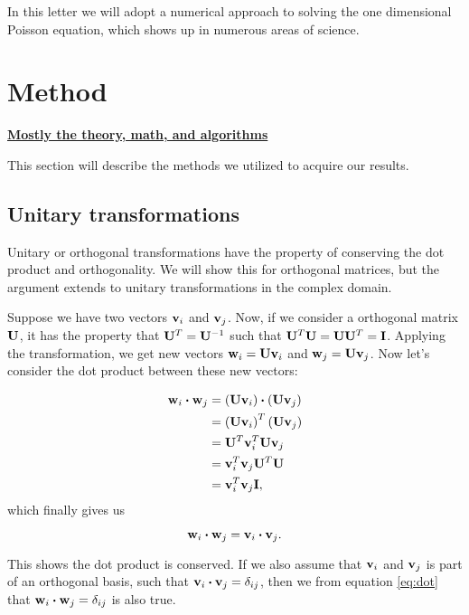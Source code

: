 \documentclass{emulateapj}
\begin{document}
In this letter we will adopt a numerical approach to solving the one dimensional Poisson equation, which shows up in numerous areas of science.

\section{Method}
\label{sec:method}
\underline{\textbf{Mostly the theory, math, and algorithms}}

This section will describe the methods we utilized to acquire our results.

\subsection{Unitary transformations}
Unitary or orthogonal transformations have the property of conserving the dot product and orthogonality. We will show this for orthogonal matrices, but the argument extends to unitary transformations in the complex domain.

Suppose we have two vectors $\bold{v}_i$ and $\bold{v}_j$. Now, if we consider a orthogonal matrix $\bold{U}$, it has the property that $\bold{U}^T = \bold{U}^{-1}$ such that $\bold{U}^T\bold{U} = \bold{U}\bold{U}^T = \bold{I}$. Applying the transformation, we get new vectors $\bold{w}_i = \bold{U}\bold{v}_i$ and $ \bold{w}_j = \bold{U}\bold{v}_j$.
Now let's consider the dot product between these new vectors:

\begin{align*}
	\bold{w}_i \boldsymbol{\cdot} \bold{w}_j &= \left(\bold{U}\bold{v}_i\right) \boldsymbol{\cdot} \left(\bold{U}\bold{v}_j\right) \\
	&= \left(\bold{U}\bold{v}_i\right)^T \left(\bold{U}\bold{v}_j\right) \\
	&= \bold{U}^T \bold{v}_i^T \bold{U}\bold{v}_j \\
	&= \bold{v}_i^T  \bold{v}_j \bold{U}^T \bold{U} \\
	&= \bold{v}_i^T  \bold{v}_j \bold{I},
\end{align*}
which finally gives us

\begin{equation} \label{eq:dot}
	\bold{w}_i \boldsymbol{\cdot} \bold{w}_j = \bold{v}_i \boldsymbol{\cdot} \bold{v}_j.
\end{equation}


This shows the dot product is conserved. If we also assume that $\bold{v}_i$ and $\bold{v}_j$ is part of an orthogonal basis, such that $\bold{v}_i \boldsymbol{\cdot} \bold{v}_j = \delta_{ij}$, then we from equation \ref{eq:dot} that $\bold{w}_i \boldsymbol{\cdot} \bold{w}_j = \delta_{ij}$ is also true.
\end{document}
